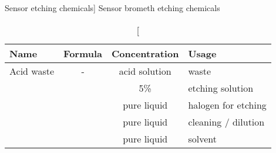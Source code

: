 \documentclass[../main.tex]{subfiles}%
\begin{document}
%
    \Xtable%
    \begin{table}%
        \caption%
            [Sensor  etching chemicals]%
            {Sensor \gls{brometh} etching chemicals}%
        \label{tbl:sensor-etch-chemicals}%
        \begin{tabu}{ p{1.25in} c c p{1.25in} }%
            \toprule%
            \centering\textbf{Name} &%
            \centering\textbf{Formula} &%
            \centering\textbf{Concentration} &%
            \centering\textbf{Usage}\\%
            \toprule%
            Acid waste &%
            - &%
            acid solution &%
            waste \\%
             &%
             &%
            5\%  &%
            etching solution \\%
             &%
             &%
            pure liquid &%
            halogen for etching \\%
             &%
             &%
            pure liquid &%
            cleaning / dilution \\%
             &%
             &%
            pure liquid &%
            solvent \\%
            \bottomrule%
        \end{tabu}%
    \end{table}%
\end{document}

